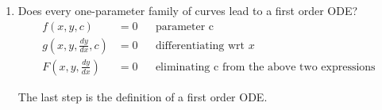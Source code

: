 \begin{enumerate}
\begin{enumerate}
\begin{figure}[H]
                    \end{figure}
              \item Does every one-parameter family of curves lead to a first order ODE?
                    \begin{align}
                        f(x, y, c)                           & = 0 &  & \text{parameter c}                                  \\
                        g\left(x, y, \frac{dy}{dx}, c\right) & = 0 &  & \text{differentiating wrt }x                        \\
                        F\left(x, y, \frac{dy}{dx}\right)    & = 0 &  & \text{eliminating c from the above two expressions}
                    \end{align}

                    The last step is the definition of a first order ODE.
          \end{enumerate}


\end{enumerate}
